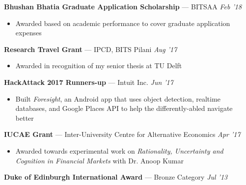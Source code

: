 \documentclass[10pt]{article}
\newenvironment{innerlist}[1][\enskip\textbullet]%
        {\begin{itemize}[#1,leftmargin=*,parsep=0pt,itemsep=0pt,topsep=0pt,partopsep=0pt]}
        {\end{itemize}}
\newcommand{\halfblankline}{\quad\vspace{-0.5\baselineskip}\pagebreak[3]}
\begin{document}
\textbf{Bhushan Bhatia Graduate Application Scholarship} --- BITSAA \hfill \emph{Feb '18}
\begin{innerlist}
\item[] Awarded based on academic performance to cover graduate application expenses
\end{innerlist}

\halfblankline

\textbf{Research Travel Grant} --- IPCD, BITS Pilani \hfill \emph{Aug '17}
\begin{innerlist}
\item[] Awarded in recognition of my senior thesis at TU Delft
\end{innerlist}
\halfblankline

\textbf{HackAttack 2017 Runners-up} --- Intuit Inc. \hfill \emph{Jun '17}
\begin{innerlist}
\item[] Built \textit{Foresight}, an Android app that uses object detection, realtime databases, and Google Places API to help the differently-abled navigate better
\end{innerlist}

\halfblankline

\textbf{IUCAE Grant} --- Inter-University Centre for Alternative Economics
\hfill \emph{Apr '17}
\begin{innerlist}
\item[] Awarded towards experimental work on \emph{Rationality, Uncertainty and Cognition in Financial Markets} with Dr. Anoop Kumar
\end{innerlist}

\halfblankline

\textbf{Duke of Edinburgh International Award} --- Bronze Category \hfill \emph{Jul '13}
\end{document}
